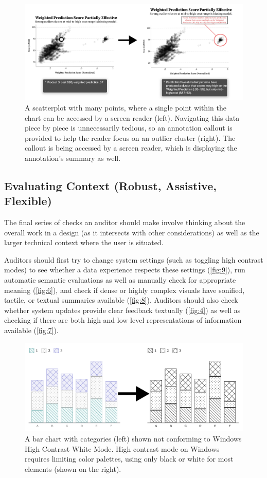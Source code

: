 \documentclass{egpubl}
\begin{document}
\begin{figure}
    \centering
    \includegraphics[width=\linewidth]{figures/figure 8.png}
    \caption{A scatterplot with many points, where a single point within the chart can be accessed by a screen reader (left). Navigating this data piece by piece is unnecessarily tedious, so an annotation callout is provided to help the reader focus on an outlier cluster (right). The callout is being accessed by a screen reader, which is displaying the annotation’s summary as well.}
    \label{fig:8}
\end{figure}

\subsection{Evaluating Context (Robust, Assistive, Flexible) }
The final series of checks an auditor should make involve thinking about the overall work in a design (as it intersects with other considerations) as well as the larger technical context where the user is situated.

Auditors should first try to change system settings (such as toggling high contrast modes) to see whether a data experience respects these settings (\autoref{fig:9}), run automatic semantic evaluations as well as manually check for appropriate meaning (\autoref{fig:6}), and check if dense or highly complex visuals have sonified, tactile, or textual summaries available (\autoref{fig:8}). Auditors should also check whether system updates provide clear feedback textually (\autoref{fig:4}) as well as checking if there are both high and low level representations of information available (\autoref{fig:7}).

\begin{figure}
    \centering
    \includegraphics[width=\linewidth]{figures/figure 9.png}
    \caption{A bar chart with categories (left) shown not conforming to Windows High Contrast White Mode. High contrast mode on Windows requires limiting color palettes, using only black or white for most elements (shown on the right).}
    \label{fig:9}
\end{figure}
\end{document}
